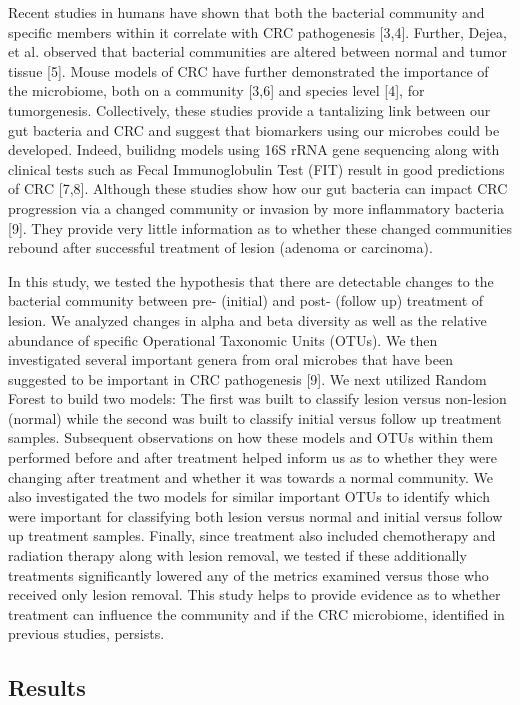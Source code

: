 \documentclass[12pt,]{article}
\begin{document}
Recent studies in humans have shown that both the bacterial community
and specific members within it correlate with CRC pathogenesis
{[}3,4{]}. Further, Dejea, et al. observed that bacterial communities
are altered between normal and tumor tissue {[}5{]}. Mouse models of CRC
have further demonstrated the importance of the microbiome, both on a
community {[}3,6{]} and species level {[}4{]}, for tumorgenesis.
Collectively, these studies provide a tantalizing link between our gut
bacteria and CRC and suggest that biomarkers using our microbes could be
developed. Indeed, builidng models using 16S rRNA gene sequencing along
with clinical tests such as Fecal Immunoglobulin Test (FIT) result in
good predictions of CRC {[}7,8{]}. Although these studies show how our
gut bacteria can impact CRC progression via a changed community or
invasion by more inflammatory bacteria {[}9{]}. They provide very little
information as to whether these changed communities rebound after
successful treatment of lesion (adenoma or carcinoma).

In this study, we tested the hypothesis that there are detectable
changes to the bacterial community between pre- (initial) and post-
(follow up) treatment of lesion. We analyzed changes in alpha and beta
diversity as well as the relative abundance of specific Operational
Taxonomic Units (OTUs). We then investigated several important genera
from oral microbes that have been suggested to be important in CRC
pathogenesis {[}9{]}. We next utilized Random Forest to build two
models: The first was built to classify lesion versus non-lesion
(normal) while the second was built to classify initial versus follow up
treatment samples. Subsequent observations on how these models and OTUs
within them performed before and after treatment helped inform us as to
whether they were changing after treatment and whether it was towards a
normal community. We also investigated the two models for similar
important OTUs to identify which were important for classifying both
lesion versus normal and initial versus follow up treatment samples.
Finally, since treatment also included chemotherapy and radiation
therapy along with lesion removal, we tested if these additionally
treatments significantly lowered any of the metrics examined versus
those who received only lesion removal. This study helps to provide
evidence as to whether treatment can influence the community and if the
CRC microbiome, identified in previous studies, persists.

\newpage

\subsection{Results}\label{results}
\end{document}

